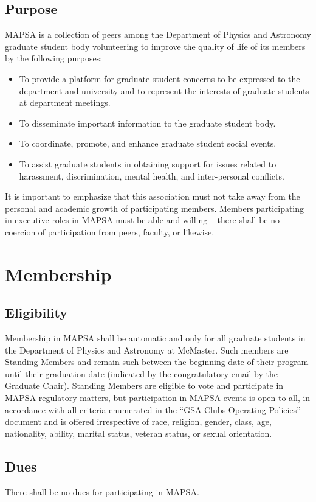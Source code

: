 \documentclass[8pt]{article}
\begin{document}
	\subsection{Purpose}
	MAPSA is a collection of peers among the Department of Physics and Astronomy graduate student body \underline{volunteering} to improve the quality of life of its members by the following purposes:
	\begin{itemize}
		\item To provide a platform for graduate student concerns to be expressed to the department and university and to represent the interests of graduate students at department meetings.
		\item To disseminate important information to the graduate student body.
		\item To coordinate, promote, and enhance graduate student social events.
		\item To assist graduate students in obtaining support for issues related to harassment, discrimination, mental health, and inter-personal conflicts.
	\end{itemize}
	It is important to emphasize that this association must not take away from the personal and academic growth of participating members. Members participating in executive roles in MAPSA must be able and willing -- there shall be no coercion of participation from peers, faculty, or likewise.
	
	\section{Membership}
	\subsection{Eligibility}
	Membership in MAPSA shall be automatic and only for all graduate students in the Department of Physics and Astronomy at McMaster. Such members are Standing Members and remain such between the beginning date of their program until their graduation date (indicated by the congratulatory email by the Graduate Chair). Standing Members are eligible to vote and participate in MAPSA regulatory matters, but participation in MAPSA events is open to all, in accordance with all criteria enumerated in the ``GSA Clubs Operating Policies'' document and is offered irrespective of race, religion, gender, class, age, nationality, ability, marital status, veteran status, or sexual orientation. 
	
	\subsection{Dues}
	There shall be no dues for participating in MAPSA.
	
\end{document}
